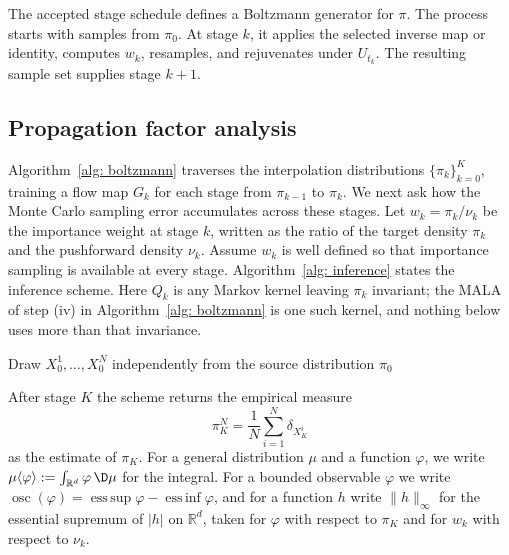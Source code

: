\documentclass{article}
\begin{document}
The accepted stage schedule defines a Boltzmann generator for $\pi$. The process starts with samples from $\pi_0$. At stage $k$, it applies the selected inverse map or identity, computes $w_k$, resamples, and rejuvenates under $U_{t_k}$. The resulting sample set supplies stage $k+1$.

\subsection{Propagation factor analysis}
\label{sec: propagation-analysis}

Algorithm~\ref{alg: boltzmann} traverses the interpolation distributions $\{\pi_k\}_{k=0}^K$, training a flow map $G_k$ for each stage from $\pi_{k-1}$ to $\pi_k$. We next ask how the Monte Carlo sampling error accumulates across these stages. Let $w_k = \pi_k/\nu_k$ be the importance weight at stage $k$, written as the ratio of the target density $\pi_k$ and the pushforward density $\nu_k$. Assume $w_k$ is well defined so that importance sampling is available at every stage. Algorithm~\ref{alg: inference} states the inference scheme. Here $Q_k$ is any Markov kernel leaving $\pi_k$ invariant; the MALA of step (iv) in Algorithm~\ref{alg: boltzmann} is one such kernel, and nothing below uses more than that invariance.

\begin{algorithm}[htb]

\caption{Inference scheme of the Boltzmann generator}
\label{alg: inference}
Draw $X_0^1,\dots,X_0^N$ independently from the source distribution $\pi_0$\;
\end{algorithm}

After stage $K$ the scheme returns the empirical measure
\begin{equation}
	\pi_K^N = \frac1N\sum_{i=1}^{N} \delta_{X_K^i}
\end{equation}
as the estimate of $\pi_K$. For a general distribution $\mu$ and a function $\varphi$, we write $\mu\langle \varphi\rangle := \int_{\mathbb R^d} \varphi \, \D\mu$ for the integral. For a bounded observable $\varphi$ we write $\operatorname{osc}(\varphi) = \operatorname{ess\,sup}\varphi - \operatorname{ess\,inf}\varphi$, and for a function $h$ write $\lVert h \rVert_\infty$ for the essential supremum of $|h|$ on $\mathbb R^d$, taken for $\varphi$ with respect to $\pi_K$ and for $w_k$ with respect to $\nu_k$.
\end{document}
